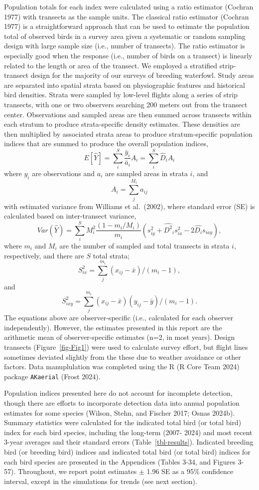 \documentclass[
]{article}
\begin{document}
Population totals for each index were calculated using a ratio estimator
(Cochran 1977) with transects as the sample units. The classical ratio
estimator (Cochran 1977) is a straightforward approach that can be used
to estimate the population total of observed birds in a survey area
given a systematic or random sampling design with large sample size
(i.e., number of transects). The ratio estimator is especially good when
the response (i.e., number of birds on a transect) is linearly related
to the length or area of the transect. We employed a stratified
strip-transect design for the majority of our surveys of breeding
waterfowl. Study areas are separated into spatial strata based on
physiographic features and historical bird densities. Strata were
sampled by low-level flights along a series of strip transects, with one
or two observers searching 200 meters out from the transect center.
Observations and sampled areas are then summed across transects within
each stratum to produce strata-specific density estimates. These
densities are then multiplied by associated strata areas to produce
stratum-specific population indices that are summed to produce the
overall population indices,
\[E[\hat Y] = \displaystyle\sum_{i}^{S} \frac{\bar y_i}{\bar a_i} A_i = \displaystyle\sum_{i}^{S} \hat D_i A_i\]
where \(y_i\) are observations and \(a_i\) are sampled areas in strata
\(i\), and \[A_i = \displaystyle\sum_{j}^{M_i} a_{ij}\] with estimated
variance from Williams et al.~(2002), where standard error (SE) is
calculated based on inter-transect variance,~
\[Var(\hat Y) = \displaystyle\sum_{i}^{S} M_i^2 \frac{(1-m_i / M_i)}{m_i} ( s^2_{iy} + \hat {D^2}_i s^2_{ia} - 2 \hat {D_i} s_{iay} ),\]
where \(m_i\) and \(M_i\) are the number of sampled and total transects
in strata \(i\), respectively, and there are \(S\) total strata;~
\[S^2_{ix} = \displaystyle\sum_{j}^{m_i} (x_{ij} - \bar x )/(m_i -1), \]
and~
\[S^2_{ixy} = \displaystyle\sum_{j}^{m_i} (x_{ij} - \bar x )(y_{ij} - \bar y )/(m_i -1).\]
The equations above are observer-specific (i.e., calculated for each
observer independently). However, the estimates presented in this report
are the arithmetic mean of observer-specific estimates (n=2, in most
years). Design transects (Figure~\ref{fig-Fig1}) were used to calculate
survey effort, but flight lines sometimes deviated slightly from the
these due to weather avoidance or other factors. Data manuplulation was
completed using the R (R Core Team 2024) package \texttt{AKaerial}
(Frost 2024).

Population indices presented here do not account for incomplete
detection, though there are efforts to incorporate detection data into
annual population estimates for some species (Wilson, Stehn, and Fischer
2017; Osnas 2024b). Summary statistics were calculated for the indicated
total bird (or total bird) index for each bird species, including the
long-term (2007- 2024) and most recent 3-year averages and their
standard errors (Table~\ref{tbl-results}). Indicated breeding bird (or
breeding bird) indices and indicated total bird (or total bird) indices
for each bird species are presented in the Appendices (Tables 3-34, and
Figures 3-57). Throughout, we report point estimates \(\pm\) 1.96 SE as
a 95\% confidence interval, except in the simulations for trends (see
next section).
\end{document}

